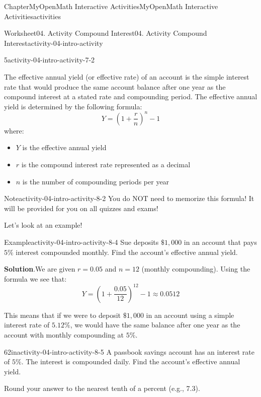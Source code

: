 \documentclass[oneside,10pt,]{book}
\newcommand{\blocktitlefont}{\relax}
\newcommand{\ptxlistdisc}{\raisebox{0.3ex}{\textbullet}}
\begin{document}
\begin{chapterptx}{Chapter}{MyOpenMath Interactive Activities}{}{MyOpenMath Interactive Activities}{}{}{activities}
\begin{worksheet-section}{Worksheet}{04. Activity Compound Interest}{}{04. Activity Compound Interest}{}{}{activity-04-intro-activity}
\begin{divisionexercise}{5}{}{}{activity-04-intro-activity-7-2}
\begin{itemize}[label=\ptxlistdisc]
\end{itemize}
%
\end{divisionexercise}%
\clearpage
The effective annual yield (or effective rate) of an account is the simple interest rate that would produce the same account balance after one year as the compound interest at a stated rate and compounding period. The effective annual yield is determined by the following formula:%
\begin{equation*}
Y = \left(1 + \frac{r}{n}\right)^n - 1
\end{equation*}
where:%
\begin{itemize}[label=\ptxlistdisc]
\item{}\(Y\) is the effective annual yield%
\item{}\(r\) is the compound interest rate represented as a decimal%
\item{}\(n\) is the number of compounding periods per year%
\end{itemize}
%
\begin{note}{Note}{}{activity-04-intro-activity-8-2}%
You do NOT need to memorize this formula! It will be provided for you on all quizzes and exams!%
\end{note}
Let's look at an example!%
\begin{example}{Example}{}{activity-04-intro-activity-8-4}%
Sue deposits \(\$1,000\) in an account that pays \(5\%\) interest compounded monthly. Find the account’s effective annual yield.%
\par\smallskip%
\noindent\textbf{\blocktitlefont Solution}.\hypertarget{activity-04-intro-activity-8-4-2}{}\quad{}We are given \(r = 0.05\) and \(n = 12\) (monthly compounding). Using the formula we see that:%
\begin{equation*}
Y = \left(1 + \frac{0.05}{12}\right)^{12} - 1 \approx 0.0512
\end{equation*}
%
\par
This means that if we were to deposit \(\$1,000\) in an account using a simple interest rate of \(5.12\%\), we would have the same balance after one year as the account with monthly compounding at \(5\%\).%
\end{example}
\begin{divisionexercise}{6}{}{2in}{activity-04-intro-activity-8-5}%
A passbook savings account has an interest rate of \(\displaystyle{5}\%\). The interest is compounded daily. Find the account's effective annual yield.%
\par
Round your answer to the nearest tenth of a percent (e.g., 7.3).%

\end{divisionexercise}
\end{worksheet-section}
\end{chapterptx}
\end{document}
